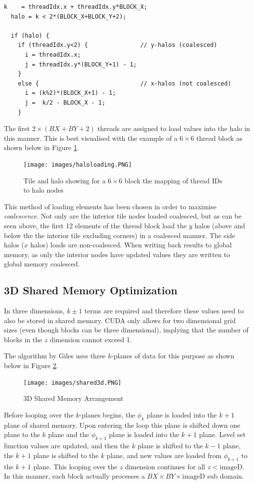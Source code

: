 \begin{verbatim}
k    = threadIdx.x + threadIdx.y*BLOCK_X;
  halo = k < 2*(BLOCK_X+BLOCK_Y+2);

  if (halo) {
    if (threadIdx.y<2) {               // y-halos (coalesced)
      i = threadIdx.x;
      j = threadIdx.y*(BLOCK_Y+1) - 1;
    }
    else {                             // x-halos (not coalesced)
      i = (k%2)*(BLOCK_X+1) - 1;
      j =  k/2 - BLOCK_X - 1;
    }
\end{verbatim}

The first $2 \times (BX + BY +2)$ threads are assigned to load values into the halo in this manner. This is best visualised with the example of a $6 \times 6$ thread block as shown below in Figure \ref{fig:haloloading}.

\begin{figure}[h]
	\centering
		\texttt{[image: images/haloloading.PNG]}
	\caption{Tile and halo showing for a $6 \times 6$ block the mapping of thread IDs to halo nodes}
	\label{fig:haloloading}
\end{figure}


This method of loading elements has been chosen in order to maximise \textit{coalescence}. Not only are the interior tile nodes loaded coalesced, but as can be seen above, the first 12 elements of the thread block load the $y$ halos (above and below the the interior tile excluding corners) in a coalesced manner. The side halos ($x$ halos) loads are non-coalesced. When writing back results to global memory, as only the interior nodes have updated values they are written to global memory coalesced.

\subsection{3D Shared Memory Optimization}
In three dimensions, $k\pm1$ terms are required and therefore these values need to also be stored in shared memory. CUDA only allows for two dimensional grid sizes (even though blocks can be three dimensional), implying that the number of blocks in the $z$ dimension cannot exceed 1. 

The algorithm by Giles \cite{mgiles} uses three $k$-planes of data for this purpose as shown below in Figure \ref{fig:shared3d}.

\begin{figure}[h]
	\centering
		\texttt{[image: images/shared3d.PNG]}
	\caption{3D Shared Memory Arrangement}
	\label{fig:shared3d}
\end{figure}


Before looping over the $k$-planes begins, the $\phi_k$ plane is loaded into the $k+1$ plane of shared memory. Upon entering the loop this plane is shifted down one plane to the $k$ plane and the $\phi_{k+1}$ plane is loaded into the $k+1$ plane. Level set function values are updated, and then the $k$ plane is shifted to the $k-1$ plane, the $k+1$ plane is shifted to the $k$ plane, and new values are loaded from $\phi_{k+1}$ to the $k+1$ plane. This looping over the $z$ dimension continues for all $z<\textrm{imageD}$. In this manner, each block actually processes a $BX \times BY \times \textrm{imageD}$ sub domain.


